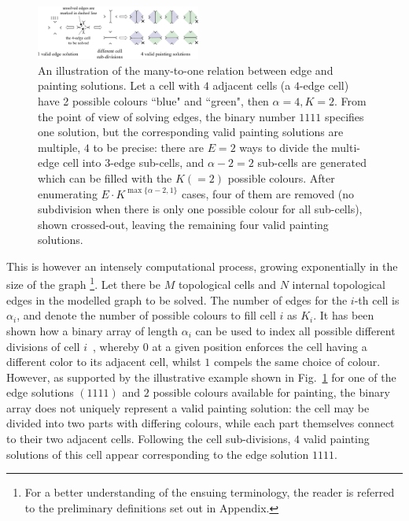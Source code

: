 \documentclass[journal]{IEEEtran}
\begin{document}
\begin{figure}[t]
\centering
\includegraphics[width = 0.48\textwidth]{figures/many_to_one_3}
\caption{An illustration of the many-to-one relation between edge and painting solutions. 
Let a cell with $4$ adjacent cells (a $4$-edge cell) have 2 possible colours ``blue" and ``green", then $\alpha = 4, K = 2$. From the point of view of solving edges, the binary number $1111$ specifies one solution, but the corresponding valid painting solutions are multiple, $4$ to be precise: there are $E=2$ ways to divide the multi-edge cell into $3$-edge sub-cells, and $\alpha-2 = 2$ sub-cells are generated which can be filled with the $K (=2)$ possible colours. After enumerating $E\cdot K^{\max\{\alpha-2, 1\}}$ cases, four of them are removed (no subdivision when there is only one possible colour for all sub-cells), shown crossed-out, leaving the remaining four valid painting solutions.
}
\label{fig:many_to_one}
\end{figure}


This is however an intensely computational process, growing exponentially in the size of the graph
\footnote{For a better understanding of the ensuing terminology, the reader is referred to the preliminary definitions set out in Appendix.}.%
Let there be $M$ topological cells and $N$ internal topological edges in the modelled graph to be solved. The number of edges for the $i$-th cell is $\alpha_i$, and denote the number of possible colours to fill cell $i$ as $K_i$.   
It has been shown how a binary array of length $\alpha_i$ can be used to index all possible different divisions of cell $i$~\cite{Yang2020Cellular}, whereby $0$ at a given position enforces the cell having a different color to its adjacent cell, whilst $1$ compels the same choice of colour. 
However, as supported by the illustrative example shown in Fig.~\ref{fig:many_to_one} for one of the edge solutions $(1111)$ and $2$ possible colours available for painting, the binary array does not uniquely represent a valid painting solution: the cell may be divided into two parts with differing colours, while each part themselves connect to their two adjacent cells. Following the cell sub-divisions, $4$ valid painting solutions of this cell appear corresponding to the edge solution $1111$. 
\end{document}
